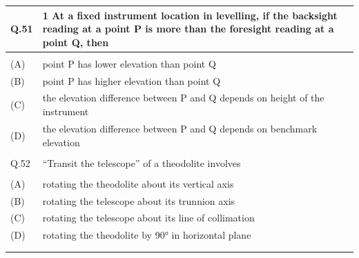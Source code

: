 \documentclass[12pt]{article}
\begin{document}
\begin{table}[H]
\renewcommand{\arraystretch}{3}
\setlength{\tabcolsep}{8pt}
\begin{tabular}{|l|p{15cm}|}
\hline
 
Q.51& 1 At a fixed instrument location in levelling, if the backsight reading at a point P is
more than the foresight reading at a point Q, then\\ \hline 
 & \\ \hline
(A)&point P has lower elevation than point Q\\ \hline
(B)&point P has higher elevation than point Q\\ \hline
(C)&the elevation difference between P and Q depends on height of the instrument\\ \hline
(D)&the elevation difference between P and Q depends on benchmark elevation\\ \hline
 & \\ \hline

Q.52 &``Transit the telescope'' of a theodolite involves\\ \hline
 & \\ \hline
(A)&rotating the theodolite about its vertical axis\\ \hline
(B)&rotating the telescope about its trunnion axis\\ \hline
(C)&rotating the telescope about its line of collimation\\ \hline
(D)&rotating the theodolite by 90° in horizontal plane\\ \hline
& \\ 
& \\ \hline

\end{tabular}
\end{table}
\end{document}
